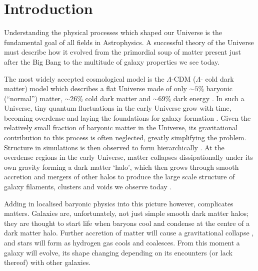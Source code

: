 \chapter{Introduction}\label{chap:intro}

Understanding the physical processes which shaped our Universe is the fundamental goal of all fields in Astrophysics. A successful theory of the Universe must describe how it evolved from the primordial soup of matter present just after the Big Bang to the multitude of galaxy properties we see today. 

The most widely accepted cosmological model is the $\Lambda$-CDM ($\Lambda$- cold dark matter) model which describes a flat Universe made of only $\sim5\%$ baryonic (``normal'') matter, $\sim26\%$ cold dark matter and $\sim69\%$ dark energy \citep{planck16}. In such a Universe, tiny quantum fluctuations in the early Universe grow with time, becoming overdense and laying the foundations for galaxy formation \citep{guth82, hawking82, linde82, starobinsky82}. Given the relatively small fraction of baryonic matter in the Universe, its gravitational contribution to this process is often neglected, greatly simplifying the problem. Structure in simulations is then observed to form hierarchically \citep{press74, gott75, white78, aarseth79, gott79, turner79, efstathiou81, davis85}. At the overdense regions in the early Universe, matter collapses dissipationally under its own gravity forming a dark matter `halo', which then grows through smooth accretion and mergers of other halos to produce the large scale structure of galaxy filaments, clusters and voids we observe today \citep[see comprehensive review by][]{frenk12}. 

Adding in localised baryonic physics into this picture however, complicates matters. Galaxies are, unfortunately, not just simple smooth dark matter halos; they are thought to start life when baryons cool and condense at the centre of a dark matter halo. Further accretion of matter will cause a gravitational collapse \citep[if angular momentum is present as a result of tidal torques then a rotating gas disc will form][]{fall80, barnes87}, and stars will form as hydrogen gas cools and coalesces. From this moment a galaxy will evolve, its shape changing depending on its encounters (or lack thereof) with other galaxies. 

